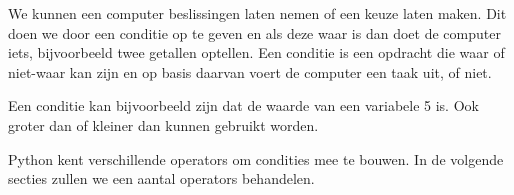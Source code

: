 We kunnen een computer beslissingen laten nemen of een keuze laten maken. Dit doen we door een conditie op te geven en als deze waar is dan doet de computer iets, bijvoorbeeld twee getallen optellen. Een conditie is een opdracht die waar of niet-waar kan zijn en op basis daarvan voert de computer een taak uit, of niet.

Een conditie kan bijvoorbeeld zijn dat de waarde van een variabele 5 is. Ook groter dan of kleiner dan kunnen gebruikt worden.

Python kent verschillende operators om condities mee te bouwen. In de volgende secties zullen we een aantal operators behandelen.


